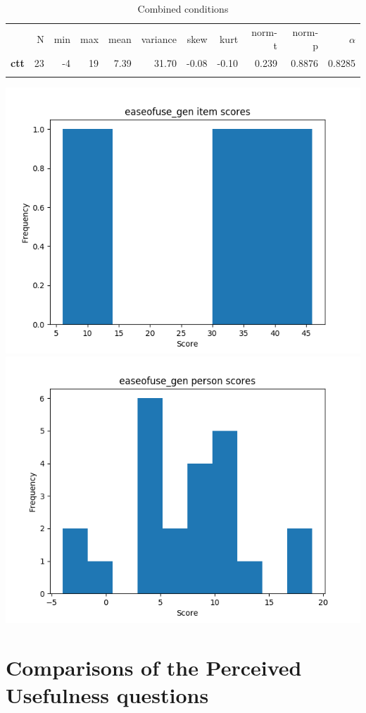 \begin{longtable}[c]{@{}lrrrrrrrrrr@{}}
\caption{Combined conditions}
\endfirsthead
\toprule\addlinespace
& N & min & max & mean & variance & skew & kurt & norm-t &
norm-p & $\alpha$
\\\addlinespace
\midrule
\textbf{ctt} & 23 & -4 & 19 & 7.39 & 31.70 & -0.08 & -0.10 & 0.239 &
0.8876 & 0.8285
\\\addlinespace
\bottomrule
\end{longtable}

\includegraphics[width=\textwidth]{img/easeofuse_gen_diff.png}
\includegraphics[width=\textwidth]{img/easeofuse_gen_abil.png}

\section{Comparisons of the Perceived Usefulness questions}


